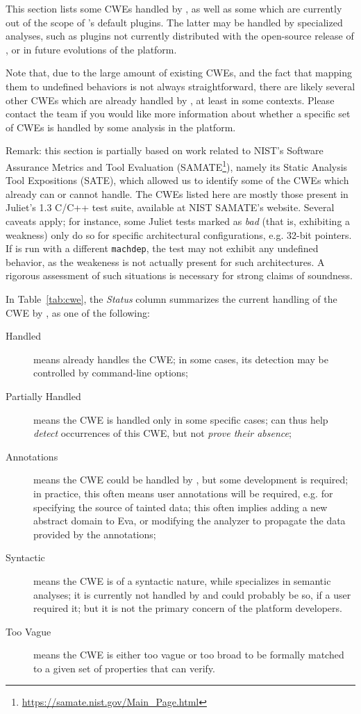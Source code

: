 This section lists some CWEs handled by \FramaC, as well as some
which are currently out of the scope of \FramaC's default plugins. The latter
may be handled by specialized analyses, such as plugins not currently
distributed with the open-source release of \FramaC, or in future evolutions
of the \FramaC platform.

Note that, due to the large amount of existing CWEs, and the fact that mapping
them to undefined behaviors is not always straightforward, there are likely
several other CWEs which are already handled by \FramaC, at least in some
contexts.
Please contact the \FramaC team if you would like more information about whether
a specific set of CWEs is handled by some analysis in the platform.

Remark: this section is partially based on work related to
NIST's Software Assurance Metrics and Tool Evaluation
(SAMATE\footnote{\url{https://samate.nist.gov/Main_Page.html}}),
namely its Static Analysis Tool Expositions (SATE),
which allowed us to identify some of the CWEs which
\FramaC already can or cannot handle. The CWEs listed here are mostly those
present in Juliet's 1.3 C/C++ test suite, available at NIST SAMATE's website.
Several caveats apply; for instance, some Juliet tests marked as {\em bad}
(that is, exhibiting a weakness) only do so for specific architectural
configurations, e.g. 32-bit pointers. If \FramaC is run with a different
\texttt{machdep}, the test may not exhibit any undefined behavior, as
the weakeness is not actually present for such architectures.
A rigorous assessment of such situations is necessary for strong claims of
soundness.

In Table~\ref{tab:cwe}, the {\em Status} column summarizes the current
handling of the CWE by \FramaC, as one of the following:

\begin{description}
\item[Handled] means \FramaC already handles the CWE; in some cases, its
  detection may be controlled by command-line options;
\item[Partially Handled] means the CWE is handled only in some specific cases;
  \FramaC can thus help {\em detect} occurrences of this CWE, but not
  {\em prove their absence};
\item[Annotations] means the CWE could be handled by \FramaC, but some
  development is required; in practice, this often means user annotations
  will be required, e.g. for specifying the source of tainted data;
  this often implies adding a new abstract domain to Eva, or modifying the
  analyzer to propagate the data provided by the annotations;
\item[Syntactic] means the CWE is of a syntactic nature, while \FramaC
  specializes in semantic analyses; it is currently not handled by \FramaC
  and could probably be so, if a user required it; but it is not the primary
  concern of the platform developers.
\item[Too Vague] means the CWE is either too vague or too broad to be formally
  matched to a given set of properties that \FramaC can verify.
\end{description}

